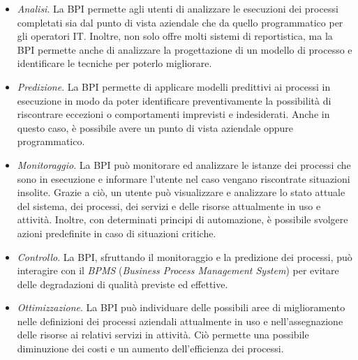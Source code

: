 \begin{itemize}
    \item \textit{Analisi}. La BPI permette agli utenti di analizzare le esecuzioni dei processi completati sia dal punto di vista aziendale che da quello programmatico per gli operatori IT. Inoltre, non solo offre molti sistemi di reportistica, ma la BPI permette anche di analizzare la progettazione di un modello di processo e identificare le tecniche per poterlo migliorare.
    \item \textit{Predizione}. La BPI permette di applicare modelli predittivi ai processi in esecuzione in modo da poter identificare preventivamente la possibilità di riscontrare eccezioni o comportamenti imprevisti e indesiderati. Anche in questo caso, è possibile avere un punto di vista aziendale oppure programmatico.
    \item \textit{Monitoraggio}. La BPI può monitorare ed analizzare le istanze dei processi che sono in esecuzione e informare l'utente nel caso vengano riscontrate situazioni insolite. Grazie a ciò, un utente può visualizzare e analizzare lo stato attuale del sistema, dei processi, dei servizi e delle risorse attualmente in uso e attività. Inoltre, con determinati principi di automazione, è possibile svolgere azioni predefinite in caso di situazioni critiche.
    \item \textit{Controllo}. La BPI, sfruttando il monitoraggio e la predizione dei processi, può interagire con il \textit{BPMS} (\textit{Business Process Management System}) per evitare delle degradazioni di qualità previste ed effettive.
    \item \textit{Ottimizzazione}. La BPI può individuare delle possibili aree di miglioramento nelle definizioni dei processi aziendali attualmente in uso e nell'assegnazione delle risorse ai relativi servizi in attività. Ciò permette una possibile diminuzione dei costi e un aumento dell'efficienza dei processi.
\end{itemize}



